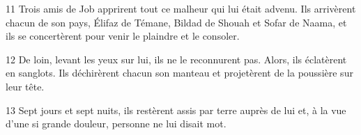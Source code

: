 
11 Trois amis de Job apprirent tout ce malheur qui lui était advenu. Ils arrivèrent chacun de son pays, Élifaz de Témane, Bildad de Shouah et Sofar de Naama, et ils se concertèrent pour venir le plaindre et le consoler.

12 De loin, levant les yeux sur lui, ils ne le reconnurent pas. Alors, ils éclatèrent en sanglots. Ils déchirèrent chacun son manteau et projetèrent de la poussière sur leur tête.

13 Sept jours et sept nuits, ils restèrent assis par terre auprès de lui et, à la vue d’une si grande douleur, personne ne lui disait mot.